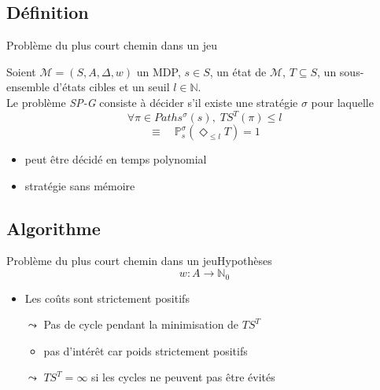 \documentclass[compress]{beamer}
\begin{document}
\subsection{Définition}
\begin{frame}{Problème du plus court chemin dans un jeu}
  \begin{definition}[SP-G]
    Soient $\mathcal{M} = (S, A, \Delta, w)$ un MDP, $s \in S$, un état de $\mathcal{M}$, $T \subseteq S$, un sous-ensemble d'états cibles et un seuil $l \in \mathbb{N}$. \\
    Le problème \textit{\color{fibeamer@orange}SP-G} consiste à décider s'il existe une stratégie $\sigma$ pour laquelle
    \[
      \forall \pi \in Paths^\sigma(s), \; TS^T(\pi) \leq l
    \]
    \[
      \equiv \quad \mathbb{P}_s^\sigma(\Diamond_{\leq l} T) = 1
    \]
  \end{definition}
  \begin{itemize}
    \item peut être décidé en temps polynomial
    \item stratégie sans mémoire
  \end{itemize}
\end{frame}

\subsection{Algorithme}
\begin{frame}{Problème du plus court chemin dans un jeu}{Hypothèses}
\[ w : A \rightarrow \mathbb{N}_0 \]
  \begin{itemize}
    \item Les coûts sont strictement positifs
    \item[$\leadsto$] Pas de cycle pendant la minimisation de $TS^T$
    \begin{itemize}
      \item pas d'intérêt car poids strictement positifs
    \end{itemize}
    \item[$\leadsto$] \alert{$TS^T = \infty$ si les cycles ne peuvent pas être évités}
  \end{itemize}
\end{frame}
\end{document}
